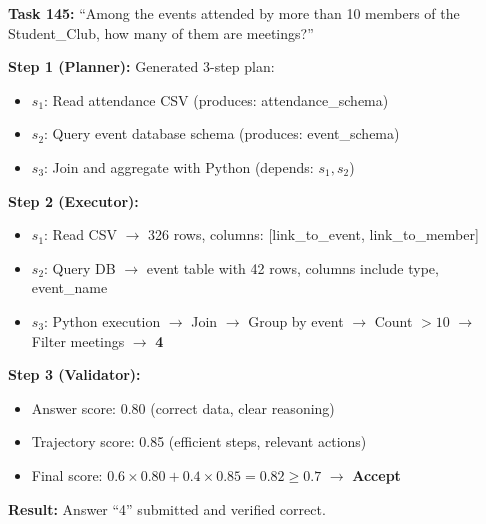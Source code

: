 \begin{findingbox}
\textbf{Task 145:} ``Among the events attended by more than 10 members of the Student\_Club, how many of them are meetings?''

\vspace{0.5em}
\textbf{Step 1 (Planner):} Generated 3-step plan:
\begin{itemize}[leftmargin=1.5em]
    \item $s_1$: Read attendance CSV (produces: attendance\_schema)
    \item $s_2$: Query event database schema (produces: event\_schema)
    \item $s_3$: Join and aggregate with Python (depends: $s_1, s_2$)
\end{itemize}

\textbf{Step 2 (Executor):}
\begin{itemize}[leftmargin=1.5em]
    \item $s_1$: Read CSV $\to$ 326 rows, columns: [link\_to\_event, link\_to\_member]
    \item $s_2$: Query DB $\to$ event table with 42 rows, columns include type, event\_name
    \item $s_3$: Python execution $\to$ Join $\to$ Group by event $\to$ Count $>10$ $\to$ Filter meetings $\to$ \textbf{4}
\end{itemize}

\textbf{Step 3 (Validator):}
\begin{itemize}[leftmargin=1.5em]
    \item Answer score: 0.80 (correct data, clear reasoning)
    \item Trajectory score: 0.85 (efficient steps, relevant actions)
    \item Final score: $0.6 \times 0.80 + 0.4 \times 0.85 = 0.82 \geq 0.7$ $\to$ \textbf{Accept}
\end{itemize}

\textbf{Result:} Answer ``4'' submitted and verified correct.
\end{findingbox}

